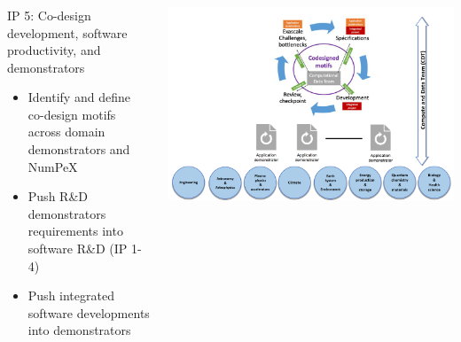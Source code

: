 \begin{frame}
  \frametitle{\insertsectionhead}
  \framesubtitle{\insertsubsectionhead}
  \begin{columns}
    \begin{column}{0.5\textwidth}
      \begin{alertblock}{IP 5: Co-design development, software productivity, and demonstrators}
      \begin{itemize}
        \item Identify and define co-design motifs across domain demonstrators and NumPeX
        \item Push R\&D demonstrators requirements into software R\&D (IP 1-4)
        \item Push integrated software developments into demonstrators      
      \end{itemize}
      \end{alertblock}
    \end{column}
    \begin{column}{.5\textwidth}
      \includegraphics[width=\textwidth]{../figures/numpex-ip5-2.png}
    \end{column}
  
  \end{columns}
\end{frame}
